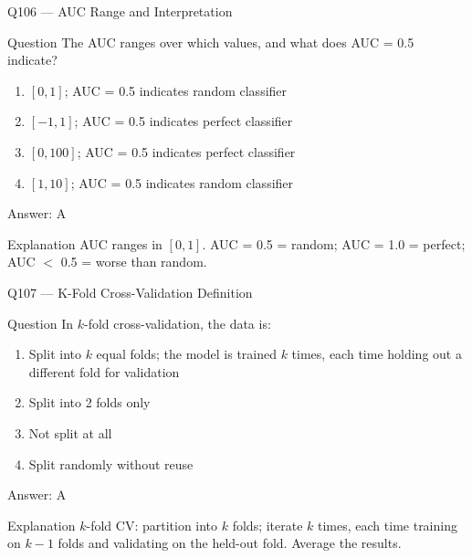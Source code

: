 \documentclass[aspectratio=169,8pt]{beamer}
\begin{document}
	\begin{frame}{Q106 --- AUC Range and Interpretation}
		\begin{block}{Question}
			The AUC ranges over which values, and what does AUC = 0.5 indicate?
			\begin{enumerate}
				\item $[0, 1]$; AUC = 0.5 indicates random classifier
				\item $[-1, 1]$; AUC = 0.5 indicates perfect classifier
				\item $[0, 100]$; AUC = 0.5 indicates perfect classifier
				\item $[1, 10]$; AUC = 0.5 indicates random classifier
			\end{enumerate}
		\end{block}
		\begin{exampleblock}{Answer: A}\end{exampleblock}
		\begin{block}{Explanation}
			AUC ranges in $[0, 1]$. AUC = 0.5 = random; AUC = 1.0 = perfect; AUC $<$ 0.5 = worse than random.
		\end{block}
	\end{frame}
	
	\begin{frame}{Q107 --- K-Fold Cross-Validation Definition}
		\begin{block}{Question}
			In $k$-fold cross-validation, the data is:
			\begin{enumerate}
				\item Split into $k$ equal folds; the model is trained $k$ times, each time holding out a different fold for validation
				\item Split into 2 folds only
				\item Not split at all
				\item Split randomly without reuse
			\end{enumerate}
		\end{block}
		\begin{exampleblock}{Answer: A}\end{exampleblock}
		\begin{block}{Explanation}
			$k$-fold CV: partition into $k$ folds; iterate $k$ times, each time training on $k-1$ folds and validating on the held-out fold. Average the results.
		\end{block}
	\end{frame}
	
\end{document}
